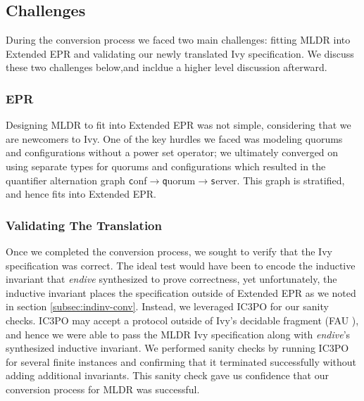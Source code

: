 \documentclass[runningheads]{llncs}
\newcommand{\ivy}[1]{{\small\texttt #1}}
\begin{document}
\subsection{Challenges}

During the conversion process we faced two main challenges: fitting MLDR into Extended EPR and validating our newly translated Ivy specification.  We discuss these two challenges below,and incldue a higher level discussion afterward.

\subsubsection{EPR}
\label{sec:mldr-epr}



Designing MLDR to fit into Extended EPR was not simple, considering that we are newcomers to Ivy.  One of the key hurdles we faced was modeling quorums and configurations without a power set operator; we ultimately converged on using separate types for quorums and configurations which resulted in the quantifier alternation graph \ivy{conf}$\to$\ivy{quorum}$\to$\ivy{server}.  This graph is stratified, and hence fits into Extended EPR.  

\subsubsection{Validating The Translation}


Once we completed the conversion process, we sought to verify that the Ivy specification was correct.  The ideal test would have been to encode the inductive invariant that \textit{endive} synthesized to prove correctness, yet unfortunately, the inductive invariant places the specification outside of Extended EPR as we noted in section \ref{subsec:indinv-conv}.  Instead, we leveraged IC3PO for our sanity checks.  IC3PO may accept a protocol outside of Ivy's decidable fragment (FAU \cite{Ge2009Complete}), and hence we were able to pass the MLDR Ivy specification along with \textit{endive}'s synthesized inductive invariant.  We performed sanity checks by running IC3PO for several finite instances and confirming that it terminated successfully without adding additional invariants.  This sanity check gave us confidence that our conversion process for MLDR was successful.
\end{document}
